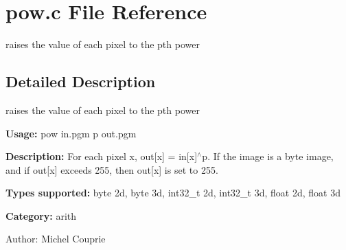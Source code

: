 \section{pow.c File Reference}
\label{pow_8c}
raises the value of each pixel to the pth power  




\label{_details}
\subsection{Detailed Description}
raises the value of each pixel to the pth power 

{\bf Usage:} pow in.pgm p out.pgm

{\bf Description:} For each pixel x, out[x] = in[x]$^\wedge$p. If the image is a byte image, and if out[x] exceeds 255, then out[x] is set to 255.

{\bf Types supported:} byte 2d, byte 3d, int32\_\-t 2d, int32\_\-t 3d, float 2d, float 3d

{\bf Category:} arith

\begin{Desc}
\item[Author:]Michel Couprie \end{Desc}
